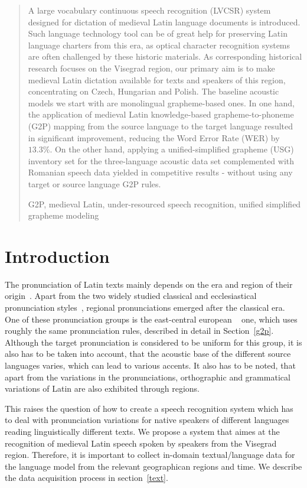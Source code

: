 \documentclass[runningheads,a4paper]{llncs}
\newcommand{\keywords}[1]{\par\addvspace\baselineskip
\noindent\keywordname\enspace\ignorespaces#1}
\begin{document}
%
%
%
%
\begin{abstract}
A large vocabulary continuous speech recognition (LVCSR) system designed for dictation of medieval Latin language documents is introduced.
Such language technology tool can be of great help for preserving Latin language charters from this era, as optical character recognition systems are often challenged by these historic materials.
As corresponding historical research focuses on the Visegrad region, our primary aim is to make medieval Latin dictation available for texts and speakers of this region, concentrating on Czech, Hungarian and Polish.
The baseline acoustic models we start with are monolingual grapheme-based ones. 
In one hand, the application of medieval Latin knowledge-based grapheme-to-phoneme (G2P) mapping from the source language to the target language resulted in significant improvement, reducing the Word Error Rate (WER) by $13.3\%$. 
On the other hand, applying a unified-simplified grapheme (USG) inventory set for the three-language acoustic data set complemented with Romanian speech data yielded in competitive results - without using any target or source language G2P rules.
\keywords{G2P, medieval Latin, under-resourced speech recognition, unified simplified grapheme modeling}
\end{abstract}

\section{Introduction}
The pronunciation of Latin texts mainly depends on the era and region of their origin~\cite{regional}.
Apart from the two widely studied classical and ecclesiastical pronunciation styles~\cite{allen78}, regional pronunciations emerged after the classical era.
One of these pronunciation groups is the east-central european ~\cite{regional} one, which uses roughly the same pronunciation rules, described in detail in Section~\ref{g2p}.
Although the target pronunciation is considered to be uniform for this group, it is also has to be taken into account, that the acoustic base of the different source languages varies, which can lead to various accents.
It also has to be noted, that apart from the variations in the pronunciations, orthographic and grammatical variations of Latin are also exhibited through regions.

This raises the question of how to create a speech recognition system which has to deal with pronunciation variations for native speakers of different languages reading linguistically different texts.
We propose a system that aimes at the recognition of medieval Latin speech spoken by speakers from the Visegrad region.
Therefore, it is important to collect in-domain textual/language data for the language model from the relevant geographican regions and time.
We describe the data acquisition process in section~\ref{text}.
\end{document}
